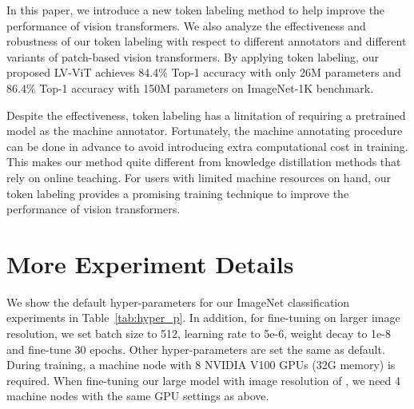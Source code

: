 \documentclass{article}
\newcommand{\nameofmethod}{LV-ViT}
\begin{document}
In this paper, we introduce a new token labeling method to help improve the performance  of vision transformers.
We also analyze the effectiveness and robustness of our token labeling
with respect to different annotators and different variants of patch-based vision transformers.
By applying token labeling, our proposed \nameofmethod{} achieves 84.4\% Top-1 accuracy
with only 26M parameters and 86.4\% Top-1 accuracy with 150M parameters on ImageNet-1K benchmark.

Despite the effectiveness, token labeling has a limitation of requiring a pretrained model as the machine annotator.
Fortunately, the machine annotating procedure can be done in advance to avoid introducing extra computational cost in training.
This makes our method quite different from knowledge distillation methods that rely on online teaching.
For users with limited machine resources on hand, our token labeling provides a promising training technique to improve the performance of vision transformers.

\medskip

{
\small


}
\newpage
\appendix

\section{More Experiment Details}
We show the default hyper-parameters for our ImageNet classification experiments in Table~\ref{tab:hyper_p}. In addition, for fine-tuning on larger image resolution, we set batch size to 512, learning rate to 5e-6, weight decay to 1e-8 and fine-tune 30 epochs. Other hyper-parameters are set the same as default. During training, a machine node with 8 NVIDIA V100 GPUs (32G memory) is required. When fine-tuning our large model with image resolution of , we need 4 machine nodes with the same GPU settings as above.
\end{document}
